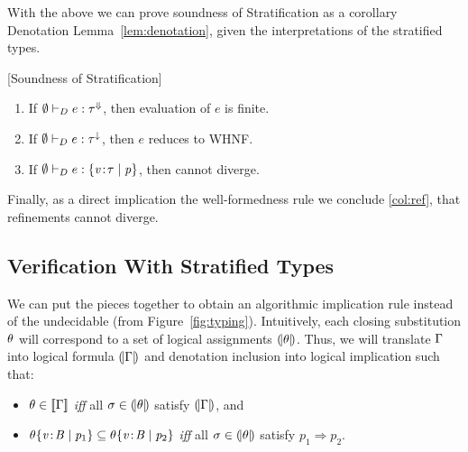 With the above we can prove soundness of Stratification as a corollary 
Denotation Lemma~\ref{lem:denotation}, given the interpretations of 
the stratified types. 
%
\begin{corollary}{[Soundness of Stratification]}\label{cor:stratification} 
\begin{enumerate}
  \item If $\emptyset \vdash_D e:{\tau}^{\Downarrow}$, then  evaluation of $e$ is finite.
  \item If $\emptyset \vdash_D e:{\tau}^{\downarrow}$, then  $e$ reduces to WHNF.
  \item\label{col:ref} If $\emptyset \vdash_D e:\{ {\mathit{v}\!:\!\tau} \mid \mathit{p} \}$, then \p cannot diverge.
\end{enumerate}
\end{corollary}

Finally, as a direct implication the well-formedness rule \rwbased 
we conclude \ref{col:ref}, \ie that refinements cannot diverge.

\subsection{Verification With Stratified Types}\label{sec:typing:vc}

We can put the pieces together to obtain an algorithmic implication 
rule \rtdimp instead of the undecidable \rimpl (from Figure~\ref{fig:typing}).
%
Intuitively, each closing substitution $\theta$ will correspond to 
a set of logical assignments $(\!|\theta|\!)$. 
%
Thus, we will translate $\Gamma$ into logical
formula $(\!|\Gamma|\!)$ and 
denotation inclusion into logical implication 
such that:
%
\begin{itemize}
\item $\theta \in [\![\Gamma]\!]$ \textit{iff} all $\sigma \in (\!|\theta|\!)$ 
     satisfy $(\!|\Gamma|\!)$, and 
\item ${\theta}{\{ {\mathit{v}\!:\!\mathit{B}} \mid \mathit{p}_1 \}}\subseteq {\ensuremath{\theta}}{\ensuremath{\{ {\mathit{v}\!:\!\mathit{B}} \mid \mathit{p}_2 \}}}$ 
		\textit{iff} all $\sigma \in (\!|\theta|\!)$ satisfy $p_1 \Rightarrow p_2$.
\end{itemize} 


